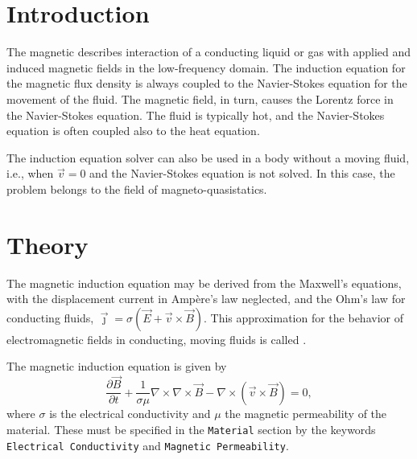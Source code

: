 \noindent
{}
\begin{versiona}

\section{Introduction}

The magnetic  describes interaction of a conducting
liquid or gas with applied and induced magnetic fields in the low-frequency
domain. The induction equation for the magnetic flux density is always coupled
to the Navier-Stokes equation for the movement of the fluid. The magnetic
field, in turn, causes the Lorentz force in the Navier-Stokes equation. The
fluid is typically hot, and the Navier-Stokes equation is often coupled also
to the heat equation.

The induction equation solver can also be used in a body without a moving
fluid, i.e., when $\vec{v}=0$ and the Navier-Stokes equation is not solved.
In this case, the problem belongs to the field of magneto-quasistatics.

\section{Theory}

The magnetic induction equation may be derived from the Maxwell's equations,
with the displacement current in Amp\`{e}re's law neglected, and the Ohm's law
for conducting fluids,
$\vec{\jmath} = \sigma ( \vec{E} + \vec{v}\times\vec{B} )$. This approximation
for the behavior of electromagnetic
fields in conducting, moving fluids is called .

The magnetic induction equation is given by
\begin{equation}
\frac{\partial \vec{B}}{\partial t} + \frac{1}{\sigma\mu}\nabla\times\nabla\times \vec{B} - 
\nabla\times(\vec{v}\times \vec{B}) = 0,\label{induction}
\end{equation}
where $\sigma$ is the electrical conductivity and
$\mu$ the magnetic permeability of the material. These must be specified in the
{\tt Material} section by the
keywords {\tt Electrical Conductivity} and {\tt Magnetic Permeability}.


\end{versiona}
